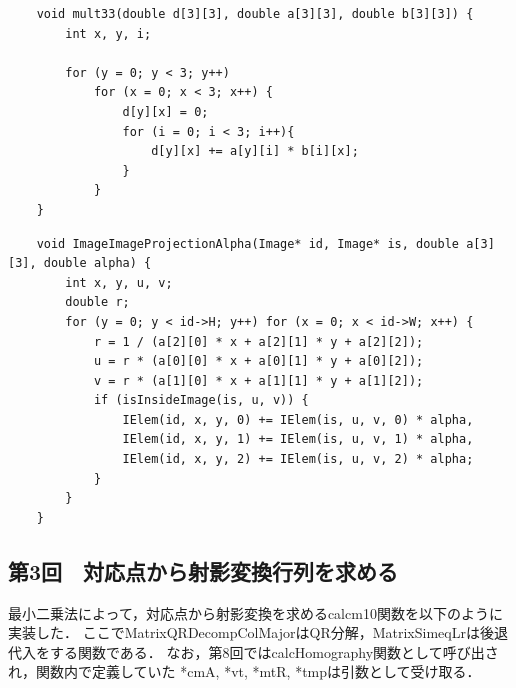 \documentclass[11pt]{jarticle}
\begin{document}
\begin{lstlisting}
    void mult33(double d[3][3], double a[3][3], double b[3][3]) {
        int x, y, i;
    
        for (y = 0; y < 3; y++)
            for (x = 0; x < 3; x++) {
                d[y][x] = 0;
                for (i = 0; i < 3; i++){
                    d[y][x] += a[y][i] * b[i][x];
                }
            }
    }
\end{lstlisting}

\begin{lstlisting}
    void ImageImageProjectionAlpha(Image* id, Image* is, double a[3][3], double alpha) {
        int x, y, u, v;
        double r;
        for (y = 0; y < id->H; y++) for (x = 0; x < id->W; x++) {
            r = 1 / (a[2][0] * x + a[2][1] * y + a[2][2]);
            u = r * (a[0][0] * x + a[0][1] * y + a[0][2]);
            v = r * (a[1][0] * x + a[1][1] * y + a[1][2]);
            if (isInsideImage(is, u, v)) {
                IElem(id, x, y, 0) += IElem(is, u, v, 0) * alpha,
                IElem(id, x, y, 1) += IElem(is, u, v, 1) * alpha,
                IElem(id, x, y, 2) += IElem(is, u, v, 2) * alpha;
            }
        }
    }
\end{lstlisting}

\subsection{第3回　対応点から射影変換行列を求める}

最小二乗法によって，対応点から射影変換を求めるcalcm10関数を以下のように実装した．
ここでMatrixQRDecompColMajorはQR分解，MatrixSimeqLrは後退代入をする関数である．
なお，第8回ではcalcHomography関数として呼び出され，関数内で定義していた
*cmA, *vt, *mtR, *tmpは引数として受け取る．
\end{document}
